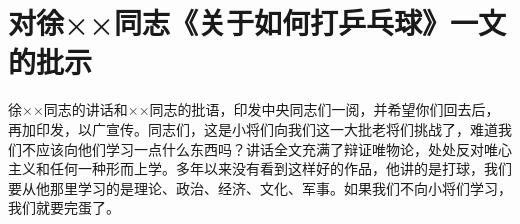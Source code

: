 \section[对徐××同志《关于如何打乒乓球》一文的批示（一九六五年一月十二日）]{对徐××同志《关于如何打乒乓球》一文的批示}


徐××同志的讲话和××同志的批语，印发中央同志们一阅，并希望你们回去后，再加印发，以广宣传。同志们，这是小将们向我们这一大批老将们挑战了，难道我们不应该向他们学习一点什么东西吗？讲话全文充满了辩证唯物论，处处反对唯心主义和任何一种形而上学。多年以来没有看到这样好的作品，他讲的是打球，我们要从他那里学习的是理论、政治、经济、文化、军事。如果我们不向小将们学习，我们就要完蛋了。

